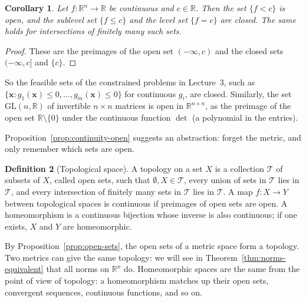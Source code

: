 \documentclass[11pt]{article}
\theoremstyle{definition}
\newtheorem{definition}{Definition}[section]
\theoremstyle{plain}
\newtheorem{corollary}[definition]{Corollary}
\theoremstyle{remark}
\begin{document}
\begin{corollary}\label{cor:level-sets-closed}
    Let $f: \mathbb{R}^n \to \mathbb{R}$ be continuous and $c \in \mathbb{R}$. Then the set $\{f < c\}$ is open, and the sublevel set $\{f \leq c\}$ and the level set $\{f = c\}$ are closed. The same holds for intersections of finitely many such sets.
\end{corollary}

\begin{proof}
    These are the preimages of the open set $(-\infty, c)$ and the closed sets $(-\infty, c]$ and $\{c\}$.
\end{proof}

So the feasible sets of the constrained problems in Lecture~3, such as $\{\mathbf{x} : g_1(\mathbf{x}) \leq 0, \ldots, g_m(\mathbf{x}) \leq 0\}$ for continuous $g_i$, are closed. Similarly, the set $\mathrm{GL}(n, \mathbb{R})$ of invertible $n \times n$ matrices is open in $\mathbb{R}^{n \times n}$, as the preimage of the open set $\mathbb{R} \setminus \{0\}$ under the continuous function $\det$ (a polynomial in the entries).

Proposition~\ref{prop:continuity-open} suggests an abstraction: forget the metric, and only remember which sets are open.

\begin{definition}[Topological space]\label{def:topology}
    A topology on a set $X$ is a collection $\mathcal{T}$ of subsets of $X$, called open sets, such that $\emptyset, X \in \mathcal{T}$, every union of sets in $\mathcal{T}$ lies in $\mathcal{T}$, and every intersection of finitely many sets in $\mathcal{T}$ lies in $\mathcal{T}$. A map $f: X \to Y$ between topological spaces is continuous if preimages of open sets are open. A homeomorphism is a continuous bijection whose inverse is also continuous; if one exists, $X$ and $Y$ are homeomorphic.
\end{definition}

By Proposition~\ref{prop:open-sets}, the open sets of a metric space form a topology. Two metrics can give the same topology: we will see in Theorem~\ref{thm:norms-equivalent} that all norms on $\mathbb{R}^n$ do. Homeomorphic spaces are the same from the point of view of topology: a homeomorphism matches up their open sets, convergent sequences, continuous functions, and so on.
\end{document}
